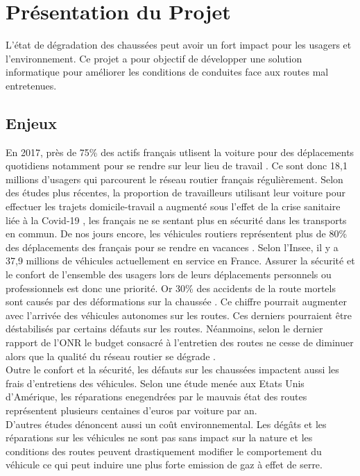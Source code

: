 \section{Présentation du Projet}
L'état de dégradation des chaussées peut avoir un fort impact pour les usagers
et l'environnement. Ce projet a pour objectif de développer une solution
informatique pour améliorer les conditions de conduites face aux routes mal
entretenues.

\subsection{Enjeux}
En 2017, près de 75\% des actifs français utlisent la voiture pour des
déplacements quotidiens notamment pour se rendre sur leur lieu de travail
\cite{insee}. Ce sont donc 18,1 millions d'usagers qui parcourent le réseau
routier français régulièrement. Selon des études plus récentes, la proportion
de travailleurs utilisant leur voiture pour effectuer les trajets
domicile-travail a augmenté sous l'effet de la crise sanitaire liée à la
Covid-19 \cite{covid}, les français ne se sentant plus en sécurité dans les
transports en commun.
De nos jours encore, les véhicules routiers représentent plus de 80\% des
déplacements des français pour se rendre en vacances \cite{vacances}.
Selon l'Insee, il y a 37,9 millions de véhicules actuellement en service en
France.
Assurer la sécurité et le confort de l'ensemble des usagers lors de leurs
déplacements personnels ou professionnels est donc une priorité. Or 30\% des
accidents de la route mortels sont causés par des déformations sur la chaussée
\cite{europe1}. Ce chiffre pourrait augmenter avec l'arrivée des véhicules
autonomes sur les routes. Ces derniers pourraient être déstabilisés par
certains défauts sur les routes.
Néanmoins, selon le dernier rapport de l'ONR le budget consacré à l'entretien
des routes ne cesse de diminuer \cite{onr} alors que la qualité du réseau
routier se dégrade \cite{tf1}.\\

Outre le confort et la sécurité, les défauts sur les chaussées impactent aussi
les frais d'entretiens des véhicules. Selon une étude menée aux Etats Unis
d'Amérique, les réparations enegendrées par le mauvais état des routes
représentent plusieurs centaines d'euros par voiture par an.\\

D'autres études dénoncent aussi un coût environnemental. Les dégâts et les
réparations sur les véhicules ne sont pas sans impact sur la nature
\cite{pneus} et les conditions des routes peuvent drastiquement modifier le
comportement du véhicule ce qui peut induire une plus forte emission de gaz à
effet de serre.\\

